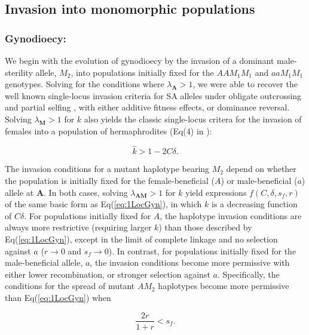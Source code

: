 \documentclass[9pt,twocolumn,twoside,lineno]{gsajnl}
\begin{document}
\subsection{Invasion into monomorphic populations}

\subsubsection{Gynodioecy:} We begin with the evolution of gynodioecy by the invasion of a dominant male-sterility allele, $M_2$, into populations initially fixed for the $AAM_1M_1$ and $aaM_1M_1$ genotypes. Solving for the conditions where $\lambda_{\mathbf{A}} > 1$, we were able to recover the well known single-locus invasion criteria for SA alleles under obligate outcrossing \citep{Kidwell1977} and partial selfing \citep{JordanConnallon2014,Olito2017}, with either additive fitness effects, or dominance reversal. Solving $\lambda_{\mathbf{M}} > 1$ for $k$ also yields the classic single-locus critera for the invasion of females into a population of hermaphrodites (Eq(4) in \citealt{Charlesworth1978a}):

\begin{equation}\label{eq:1LocGyn}
	\hat{k} > 1 - 2 C \delta.
\end{equation}

\noindent The invasion conditions for a mutant haplotype bearing $M_2$ depend on whether the population is initially fixed for the female-beneficial ($A$) or male-beneficial ($a$) allele at $\mathbf{A}$. In both cases, solving $\lambda_{\mathbf{AM}} > 1$ for $k$ yield expressions $f(C,\delta,s_f,r)$ of the same basic form as Eq(\ref{eq:1LocGyn}), in which $k$ is a decreasing function of $C \delta$. For populations initially fixed for $A$, the haplotype invasion conditions are always more restrictive (requiring larger $k$) than those described by Eq(\ref{eq:1LocGyn}), except in the limit of complete linkage and no selection against $a$ ($r \rightarrow 0$ and $s_f \rightarrow  0$). In contrast, for populations initially fixed for the male-beneficial allele, $a$, the invasion conditions become more permissive with either lower recombination, or stronger selection against $a$. Specifically, the conditions for the spread of mutant $AM_2$ haplotypes become more permissive than Eq(\ref{eq:1LocGyn}) when 

\begin{equation}\label{eq:2LocGyn}
	\frac{2 r}{1 + r} < s_f.
\end{equation}
\end{document}
